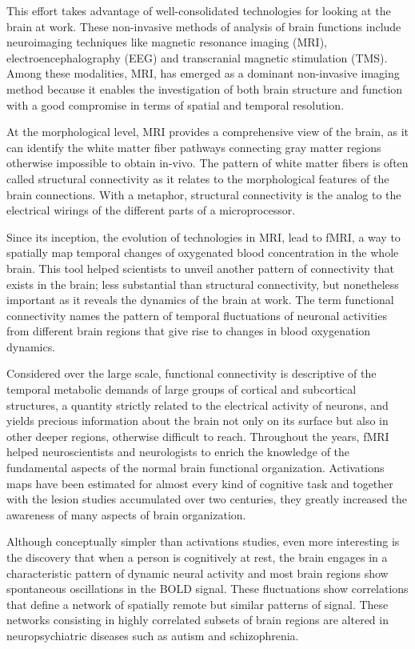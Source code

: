 This effort takes advantage of well-consolidated technologies for looking at the brain at work. These non-invasive methods of analysis of brain functions include neuroimaging techniques like magnetic resonance imaging (MRI), electroencephalography (EEG) and transcranial magnetic stimulation (TMS). Among these modalities, MRI, has emerged as a dominant non-invasive imaging method because it enables the investigation of both brain structure and function with a good compromise in terms of spatial and temporal resolution.

At the morphological level, MRI provides a comprehensive view of the brain, as it can identify the white matter fiber pathways connecting gray matter regions otherwise impossible to obtain in-vivo. The pattern of white matter fibers is often called structural connectivity as it relates to the morphological features of the brain connections. With a metaphor, structural connectivity is the analog to the electrical wirings of the different parts of a microprocessor.

Since its inception, the evolution of technologies in MRI, lead to fMRI, a way to spatially map temporal changes of oxygenated blood concentration in the whole brain. This tool helped scientists to unveil another pattern of connectivity that exists in the brain; less substantial than structural connectivity, but nonetheless important as it reveals the dynamics of the brain at work. The term functional connectivity names the pattern of temporal fluctuations of neuronal activities from different brain regions that give rise to changes in blood oxygenation dynamics.

Considered over the large scale, functional connectivity is descriptive of the temporal metabolic demands of large groups of cortical and subcortical structures, a quantity strictly related to the electrical activity of neurons, and yields precious information about the brain not only on its surface but also in other deeper regions, otherwise difficult to reach.
Throughout the years, fMRI helped neuroscientists and neurologists to enrich the knowledge of the fundamental aspects of the normal brain functional organization. Activations maps have been estimated for almost every kind of cognitive task and together with the lesion studies accumulated over two centuries, they greatly increased the awareness of many aspects of brain organization.

Although conceptually simpler than activations studies, even more interesting is the discovery that when a person is cognitively at rest, the brain engages in a characteristic pattern of dynamic neural activity and most brain regions show spontaneous oscillations in the BOLD signal. These fluctuations show correlations that define a network of spatially remote but similar patterns of signal. These networks consisting in highly correlated subsets of brain regions are altered in neuropsychiatric diseases such as autism and schizophrenia.

